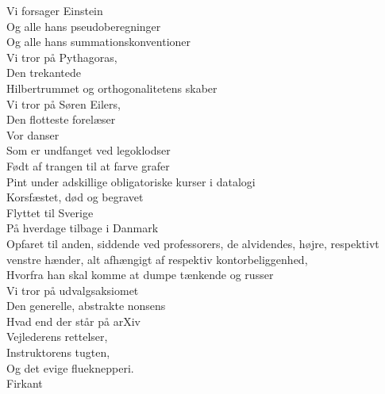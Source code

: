 \documentclass[a4paper,11pt]{article}
\begin{document}
\begin{sketch}
 Vi forsager Einstein \\
Og alle hans pseudoberegninger \\
Og alle hans summationskonventioner \\
Vi tror på Pythagoras, \\
Den trekantede \\
Hilbertrummet og orthogonalitetens skaber \\
Vi tror på Søren Eilers, \\
Den flotteste forelæser \\
Vor danser \\
Som er undfanget ved legoklodser \\
Født af trangen til at farve grafer \\
Pint under adskillige obligatoriske kurser i datalogi \\
Korsfæstet, død og begravet \\
Flyttet til Sverige \\
På hverdage tilbage i Danmark \\
Opfaret til anden, siddende ved professorers, de alvidendes, højre, respektivt venstre hænder, alt afhængigt af respektiv kontorbeliggenhed, \\
Hvorfra han skal komme at dumpe tænkende og russer \\
Vi tror på udvalgsaksiomet \\
Den generelle, abstrakte nonsens \\
Hvad end der står på arXiv \\
Vejlederens rettelser, \\
Instruktorens tugten, \\
Og det evige flueknepperi. \\
Firkant

\end{sketch}
\end{document}
